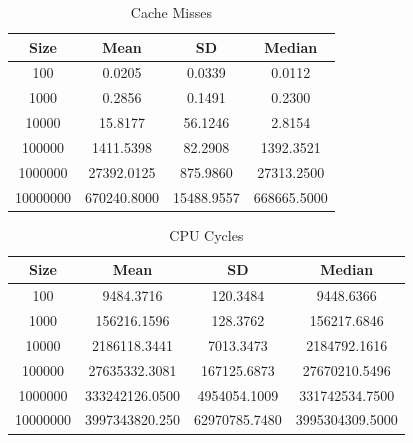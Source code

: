 \documentclass{article}
\begin{document}
\begin{table}[H]
    \centering
    \small
    \caption{Cache Misses}
    \vspace{1em}
    \begin{tabular}{ | c | c c c| }
        \hline
        Size     & Mean           & SD            & Median \\
        \hline
        100      & 0.0205         & 0.0339        & 0.0112 \\
        1000     & 0.2856         & 0.1491        & 0.2300 \\
        10000    & 15.8177        & 56.1246       & 2.8154 \\
        100000   & 1411.5398      & 82.2908       & 1392.3521 \\
        1000000  & 27392.0125     & 875.9860      & 27313.2500 \\
        10000000 & 670240.8000    & 15488.9557    & 668665.5000 \\
        \hline
    \end{tabular}
\end{table}

\begin{table}[H]
    \centering
    \small
    \caption{CPU Cycles}
    \vspace{1em}
    \begin{tabular}{ | c | c c c | }
        \hline
        Size     & Mean           & SD            & Median \\
        \hline
        100      & 9484.3716      & 120.3484      & 9448.6366 \\
        1000     & 156216.1596    & 128.3762      & 156217.6846 \\
        10000    & 2186118.3441   & 7013.3473     & 2184792.1616 \\
        100000   & 27635332.3081  & 167125.6873   & 27670210.5496 \\
        1000000  & 333242126.0500 & 4954054.1009  & 331742534.7500 \\
        10000000 & 3997343820.250 & 62970785.7480 & 3995304309.5000 \\
        \hline
    \end{tabular}
\end{table}
    
\end{document}
